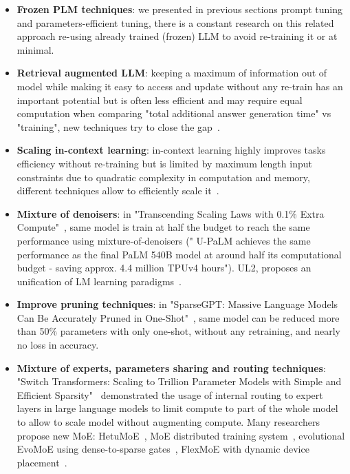 \documentclass[acmsmall]{acmart}
\begin{document}
\begin{itemize}
    \item \textbf{Frozen PLM techniques}: we presented in previous sections prompt tuning and parameters-efficient tuning, there is a constant research on this related approach re-using already trained (frozen) LLM to avoid re-training it or at minimal.
    \item \textbf{Retrieval augmented LLM}: keeping a maximum of information out of model while making it easy to access and update without any re-train has an important potential but is often less efficient and may require equal computation when comparing "total additional answer generation time" vs "training", new techniques try to close the gap~\citep{dejongPrecomputedMemoryOnthefly2023}.
    \item \textbf{Scaling in-context learning}: in-context learning highly improves tasks efficiency without re-training but is limited by maximum length input constraints due to quadratic complexity in computation and memory, different techniques allow to efficiently scale it~\citep{haoStructuredPromptingScaling2022, choPromptAugmentedLinearProbing2022, martinsInftyFormerInfinite2022}.
    \item \textbf{Mixture of denoisers}: in "Transcending Scaling Laws with 0.1\% Extra Compute"~\citep{tayTranscendingScalingLaws2022}, same model is train at half the budget to reach the same performance using mixture-of-denoisers (" U-PaLM achieves the same performance as the final PaLM 540B model at around half its computational budget - saving approx. 4.4 million TPUv4 hours"). UL2, proposes an unification of LM learning paradigms~\citep{tayUL2UnifyingLanguage2022}.
    \item \textbf{Improve pruning techniques}: in "SparseGPT: Massive Language Models Can Be Accurately Pruned in One-Shot"~\citep{frantarSparseGPTMassiveLanguage2023}, same model can be reduced more than 50\% parameters with only one-shot, without any retraining, and nearly no loss in accuracy.
    \item \textbf{Mixture of experts, parameters sharing and routing techniques}: "Switch Transformers: Scaling to Trillion Parameter Models with Simple and Efficient Sparsity"~\citep{fedusSwitchTransformersScaling2022} demonstrated the usage of internal routing to expert layers in large language models to limit compute to part of the whole model to allow to scale model without augmenting compute. Many researchers propose new MoE: HetuMoE~\citep{nieHetuMoEEfficientTrillionscale2022}, MoE distributed training system~\citep{nieHetuMoEEfficientTrillionscale2022}, evolutional EvoMoE using dense-to-sparse gates~\citep{nieEvoMoEEvolutionalMixtureofExperts2022}, FlexMoE with dynamic device placement~\citep{nieFlexMoEScalingLargescale2023}.

\end{itemize}
\end{document}
